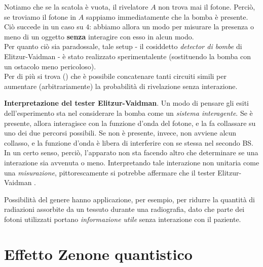 \documentclass[../../InformazioneQuantistica.tex]{subfiles}
\begin{document}
Notiamo che se la scatola è vuota, il rivelatore $A$ non trova mai il fotone. Perciò, se troviamo il fotone in $A$ sappiamo immediatamente che la bomba è presente. Ciò succede in un caso su $4$: abbiamo allora un modo per misurare la presenza  o meno di un oggetto \textbf{senza} interagire con esso in alcun modo.\\
Per quanto ciò sia paradossale, tale setup - il cosiddetto \textit{detector di bombe} di Elitzur-Vaidman - è stato realizzato sperimentalente (sostituendo la bomba con un ostacolo meno pericoloso).\\
Per di più si trova (\cite{detection-free}) che è possibile concatenare tanti circuiti simili per aumentare (arbitrariamente) la probabilità di rivelazione senza interazione.\\

\begin{expl}
\textbf{Interpretazione del tester Elitzur-Vaidman}. Un modo di pensare gli esiti dell'esperimento sta nel considerare la bomba come un \textit{sistema interagente}. Se è presente, allora interagisce con la funzione d'onda del fotone, e la fa collassare su uno dei due percorsi possibili. Se non è presente, invece, non avviene alcun collasso, e la funzione d'onda è libera di interferire con se stessa nel secondo BS. In un certo senso, perciò, l'apparato non sta facendo altro che determinare se una interazione sia avvenuta o meno. Interpretando tale interazione non unitaria come una \textit{misurazione}, pittorescamente si potrebbe affermare che il tester Elitzur-Vaidman .
\end{expl}

Possibilità del genere hanno applicazione, per esempio, per ridurre la quantità di radiazioni assorbite da un tessuto durante una radiografia, dato che parte dei fotoni utilizzati portano \textit{informazione utile} senza interazione con il paziente.

\section{Effetto Zenone quantistico}
\end{document}
